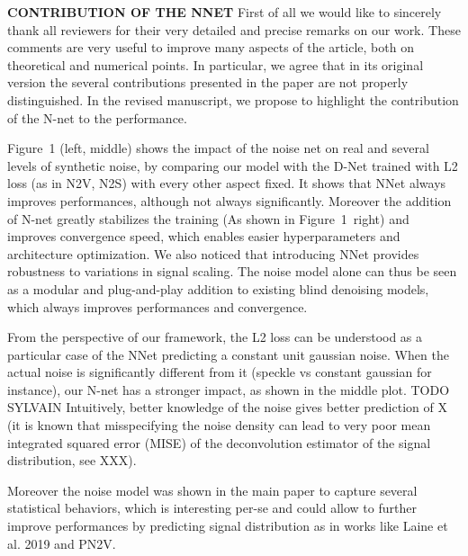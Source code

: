 \documentclass{article}
\begin{document}
\textbf{CONTRIBUTION OF THE NNET}
First of all we would like to sincerely thank all reviewers for their very detailed and precise remarks on our work. These comments are very useful to improve many aspects of the article, both on theoretical and numerical points. In particular, we agree that in its original version the several contributions presented in the paper are not properly distinguished. In the revised manuscript, we propose to highlight the contribution of the N-net to the performance.

Figure~1 (left, middle) shows the impact of the noise net on real and several levels of synthetic noise, by comparing our model with the D-Net trained with L2 loss (as in N2V, N2S) with every other aspect fixed. It shows that NNet always improves performances, although not always significantly. Moreover the addition of N-net greatly stabilizes the training (As shown in Figure~1~right) and improves convergence speed, which enables easier hyperparameters and architecture optimization. We also noticed that introducing NNet provides robustness to variations in signal scaling. The noise model alone can thus be seen as a modular and plug-and-play addition to existing blind denoising models, which always improves performances and convergence.

From the perspective of our framework, the L2 loss can be understood as a particular case of the NNet predicting a constant unit gaussian noise. When the actual noise is significantly different from it (speckle vs constant gaussian for instance), our N-net has a stronger impact, as shown in the middle plot.
TODO SYLVAIN  Intuitively, better knowledge of the noise gives better prediction of X (it is known that misspecifying the noise density can lead to very poor mean integrated squared error (MISE) of the deconvolution estimator of the signal distribution, see XXX).

Moreover the noise model was shown in the main paper to capture several statistical behaviors, which is interesting per-se and could allow to further improve performances by predicting signal distribution as in works like Laine et al. 2019 and PN2V.
\end{document}
